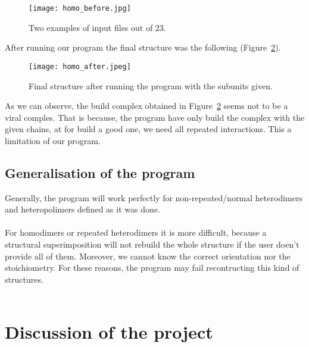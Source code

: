 \documentclass[a4paper,10pt]{report}
\begin{document}
\begin{figure}[h]
\texttt{[image: homo\_before.jpg]}
\centering
\caption{Two examples of input files out of 23.}
\label{fig:3}
\end{figure}

\noindent
After running our program the final structure was the following (Figure~\ref{fig:4}).\\

\begin{figure}[h]
\centering
\texttt{[image: homo\_after.jpeg]}
\caption{Final structure after running the program with the subunits given.}
\label{fig:4}
\end{figure}

\noindent
As we can observe, the build complex obtained in Figure~\ref{fig:4} seems not to be a viral comples. That is because, the program have only build the complex with the given chains, at for build a good one, we need all repeated interactions. This a limitation of our program.\\


\section{Generalisation of the program}

Generally, the program will work perfectly for non-repeated/normal heterodimers and heteropolimers defined as it was done.\\\\
For homodimers or repeated heterodimers it is more difficult, because a structural superimposition will not rebuild the whole structure if the user doen't provide all of them. Moreover, we cannot know the correct orientation nor the stoichiometry. For these reasons, the program may fail recontructing this kind of structures.\\\\


\chapter{Discussion of the project}
\end{document}
